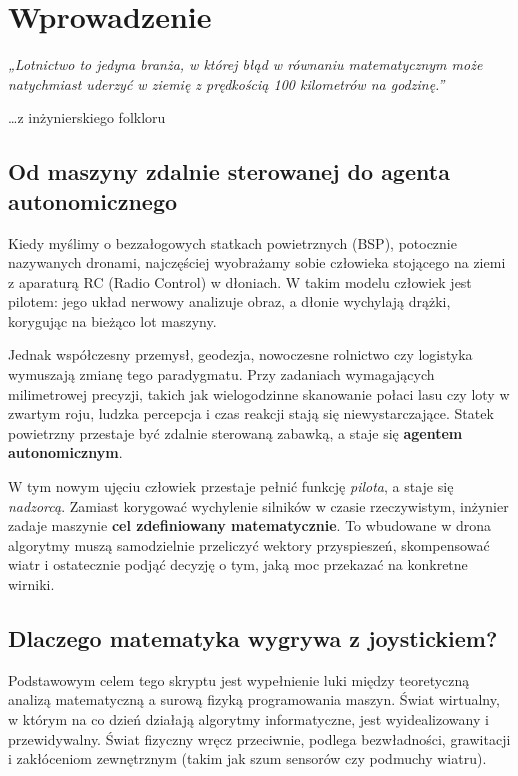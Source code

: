 \chapter{Wprowadzenie}
\epigraph{\textit{„Lotnictwo to jedyna branża, w której błąd w równaniu matematycznym może natychmiast uderzyć w ziemię z prędkością 100 kilometrów na godzinę.”}}{\ldots z inżynierskiego folkloru}

\section{Od maszyny zdalnie sterowanej do agenta autonomicznego}

Kiedy myślimy o bezzałogowych statkach powietrznych (BSP), potocznie nazywanych dronami, najczęściej wyobrażamy sobie człowieka stojącego na ziemi z aparaturą RC (Radio Control) w dłoniach. W takim modelu człowiek jest pilotem: jego układ nerwowy analizuje obraz, a dłonie wychylają drążki, korygując na bieżąco lot maszyny. 

Jednak współczesny przemysł, geodezja, nowoczesne rolnictwo czy logistyka wymuszają zmianę tego paradygmatu. Przy zadaniach wymagających milimetrowej precyzji, takich jak wielogodzinne skanowanie połaci lasu czy loty w zwartym roju, ludzka percepcja i czas reakcji stają się niewystarczające. Statek powietrzny przestaje być zdalnie sterowaną zabawką, a staje się \textbf{agentem autonomicznym}. 

W tym nowym ujęciu człowiek przestaje pełnić funkcję \textit{pilota}, a staje się \textit{nadzorcą}. Zamiast korygować wychylenie silników w czasie rzeczywistym, inżynier zadaje maszynie \textbf{cel zdefiniowany matematycznie}. To wbudowane w drona algorytmy muszą samodzielnie przeliczyć wektory przyspieszeń, skompensować wiatr i ostatecznie podjąć decyzję o tym, jaką moc przekazać na konkretne wirniki.


\section{Dlaczego matematyka wygrywa z joystickiem?}

Podstawowym celem tego skryptu jest wypełnienie luki między teoretyczną analizą matematyczną a surową fizyką programowania maszyn. Świat wirtualny, w którym na co dzień działają algorytmy informatyczne, jest wyidealizowany i przewidywalny. Świat fizyczny wręcz przeciwnie, podlega bezwładności, grawitacji i zakłóceniom zewnętrznym (takim jak szum sensorów czy podmuchy wiatru).

